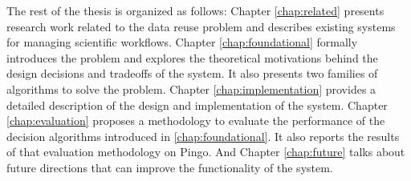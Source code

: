 The rest of the thesis is organized as follows: Chapter \ref{chap:related} presents research work related to the data reuse problem and describes existing systems for managing scientific workflows.  Chapter \ref{chap:foundational} formally introduces the problem and explores the theoretical motivations behind the design decisions and tradeoffs of the system. It also presents two families of algorithms to solve the problem. Chapter \ref{chap:implementation} provides a detailed description of the design and implementation of the system.  Chapter \ref{chap:evaluation} proposes a methodology to evaluate the performance of the decision algorithms introduced in \ref{chap:foundational}.  It also reports the results of that evaluation methodology on Pingo.  And Chapter \ref{chap:future} talks about future directions that can improve the functionality of the system.